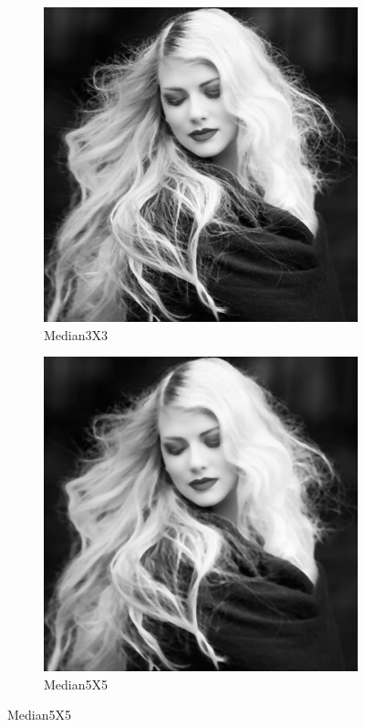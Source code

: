 \documentclass[14pt]{article}
\begin{document}
	\begin{figure}[hbt!]
		\centering
	\begin{subfigure}[b]{0.3\linewidth}
		\includegraphics[width=\linewidth]{m3.png}
		\caption{Median3X3}
	\end{subfigure}
	\begin{subfigure}[b]{0.3\linewidth}
		\includegraphics[width=\linewidth]{m5.png}
		\caption{Median5X5}
	\end{subfigure}
	\end{figure}
\newpage
\end{document}
